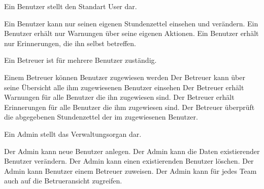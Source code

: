 \begin{requirements}
    Ein Benutzer stellt den Standart User dar.
    \begin{requirements}
         Ein Benutzer kann nur seinen eigenen Stundenzettel einsehen und verändern.
         Ein Benutzer erhält nur Warnungen über seine eigenen Aktionen.
         Ein Benutzer erhält nur Erinnerungen, die ihn selbst betreffen.
    \end{requirements}

        Ein Betreuer ist für mehrere Benutzer zuständig.
        \begin{requirements}
             Einem Betreuer können Benutzer zugewiesen werden
             Der Betreuer kann über seine Übersicht alle ihm zugewiesenen Benutzer einsehen
             Der Betreuer erhält Warnungen für alle Benutzer die ihn zugewiesen sind.
             Der Betreuer erhält Erinnerungen für alle Benutzer die ihm zugewiesen sind.
             Der Betreuer überprüft die abgegebenen Stundenzettel der im zugewiesenen Benutzer.
        \end{requirements}

        Ein Admin stellt das Verwaltungsorgan dar.
        \begin{requirements}
             Der Admin kann neue Benutzer anlegen.
             Der Admin kann die Daten existierender Benutzer verändern.
             Der Admin kann einen existierenden Benutzer löschen.
             Der Admin kann Benutzer einem Betreuer zuweisen.
             Der Admin kann für jedes Team auch auf die Betrueransicht zugreifen.
        \end{requirements}
\end{requirements}

